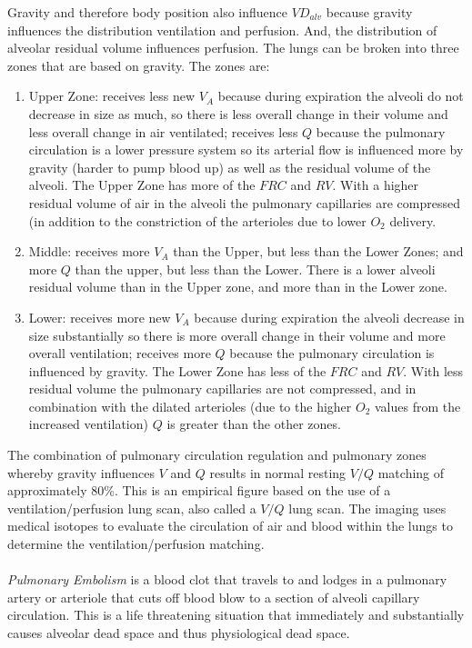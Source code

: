 Gravity and therefore body position also influence $VD_{alv}$ because gravity influences the distribution ventilation and perfusion. And, the distribution of alveolar residual volume influences perfusion. The lungs can be broken into three zones that are based on gravity.
\vspace{3mm}
The zones are:
\begin{enumerate}
    \item Upper Zone: receives less new $V_A$ because during expiration the alveoli do not decrease in size as much, so there is less overall change in their volume and less overall change in air ventilated; receives less $Q$ because the pulmonary circulation is a lower pressure system so its arterial flow is influenced more by gravity (harder to pump blood up) as well as the residual volume of the alveoli. The Upper Zone has more of the $FRC$ and $RV$. With a higher residual volume of air in the alveoli the pulmonary capillaries are compressed (in addition to the constriction of the arterioles due to lower $O_2$ delivery.
    \item Middle: receives more $V_A$ than the Upper, but less than the Lower Zones; and more $Q$ than the upper, but less than the Lower. There is a lower alveoli residual volume than in the Upper zone, and more than in the Lower zone.
    \item Lower: receives more new $V_A$ because during expiration the alveoli decrease in size substantially so there is more overall change in their volume and more overall ventilation; receives more $Q$ because the pulmonary circulation is influenced by gravity. The Lower Zone has less of the $FRC$ and $RV$. With less residual volume the pulmonary capillaries are not compressed, and in combination with the dilated arterioles (due to the higher $O_2$ values from the increased ventilation) $Q$ is greater than the other zones.
\end{enumerate}
\vspace{3mm}
The combination of pulmonary circulation regulation and pulmonary zones whereby gravity influences $V$ and $Q$ results in normal resting $V/Q$ matching of approximately 80\%. This is an empirical figure based on the use of a ventilation/perfusion lung scan, also called a $V/Q$ lung scan.  The imaging uses medical isotopes to evaluate the circulation of air and blood within the lungs to determine the ventilation/perfusion matching. 

\paragraph{} \textit{Pulmonary Embolism} is a blood clot that travels to and lodges in a pulmonary artery or arteriole that cuts off blood blow to a section of alveoli capillary circulation. This is a life threatening situation that immediately and substantially causes alveolar dead space and thus physiological dead space.


